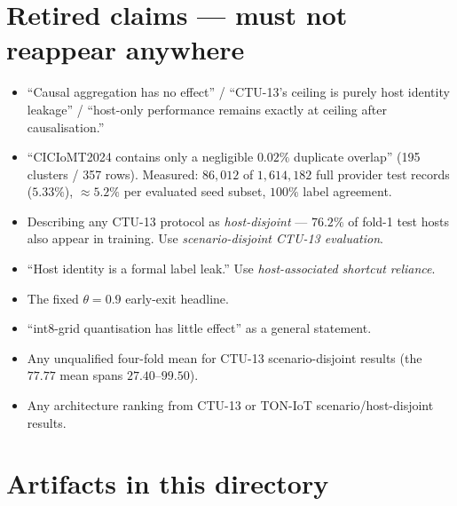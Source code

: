 \section*{Retired claims --- must not reappear anywhere}

\begin{itemize}
  \item ``Causal aggregation has no effect'' / ``CTU-13's ceiling is purely host
        identity leakage'' / ``host-only performance remains exactly at ceiling after
        causalisation.''
  \item ``CICIoMT2024 contains only a negligible $0.02\%$ duplicate overlap''
        (195 clusters / 357 rows). Measured: $86{,}012$ of $1{,}614{,}182$ full
        provider test records ($5.33\%$), $\approx5.2\%$ per evaluated seed subset,
        $100\%$ label agreement.
  \item Describing any CTU-13 protocol as \emph{host-disjoint} --- $76.2\%$ of fold-1
        test hosts also appear in training. Use \emph{scenario-disjoint CTU-13
        evaluation}.
  \item ``Host identity is a formal label leak.'' Use \emph{host-associated shortcut
        reliance}.
  \item The fixed $\theta=0.9$ early-exit headline.
  \item ``int8-grid quantisation has little effect'' as a general statement.
  \item Any unqualified four-fold mean for CTU-13 scenario-disjoint results (the
        $77.77$ mean spans $27.40$--$99.50$).
  \item Any architecture ranking from CTU-13 or TON-IoT scenario/host-disjoint
        results.
\end{itemize}

\section*{Artifacts in this directory}

